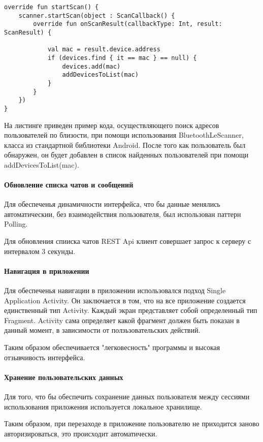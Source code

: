 \documentclass[explnote]{espd}
\begin{document}
\begin{verbatim}
override fun startScan() {
    scanner.startScan(object : ScanCallback() {
        override fun onScanResult(callbackType: Int, result: ScanResult) {

            val mac = result.device.address
            if (devices.find { it == mac } == null) {
                devices.add(mac)
                addDevicesToList(mac)
            }
        }
    })
}
\end{verbatim}

На листинге приведен пример кода, осуществляющего поиск адресов пользователей по близости, при помощи использования BluetoothLeScanner, класса из стандартной библиотеки Android. После того как пользователь был обнаружен, он будет добавлен в список найденных пользователей при помощи addDevicesToList(mac).

\paragraph{Обновление списка чатов и сообщений}
Для обеспеченья динамичности интерфейса, что бы данные менялись автоматическии, без взаимодействия пользователя, был использован паттерн Polling.

Для обновления спииска чатов REST Api клиент совершает запрос к серверу с интервалом 3 секунды.

\paragraph{Навигация в приложении}
Для обеспеченья навигации в приложении использовался подход Single Application Activity. Он заключается в том, что на все приложение создается единственный тип Activity. Каждый экран представляет собой определенный тип Fragment. Activity сама определяет какой фрагмент должен быть показан в данный момент, в зависимости от ползьзовательских действий. 

Таким образом обеспечивается "легковесность" программы и высокая отзывчивость интерфейса.

\paragraph{Хранение пользовательских данных}
Для того, что бы обеспечить сохранение данных пользователя между сессиями использования приложения используется локальное хранилище.

Таким образом, при перезаходе в приложение пользователю не приходится заново авторизироваться, это происходит автоматически. 
\end{document}
